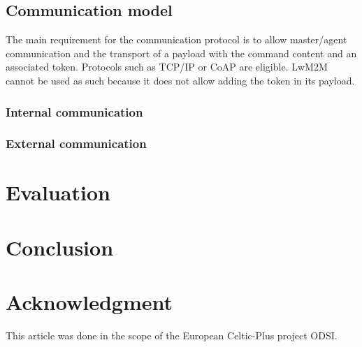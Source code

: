 \documentclass[conference]{IEEEtran}
\begin{document}
\subsection{Communication model}
\label{sec:Communication_model}
The main requirement for the communication protocol is to allow master/agent communication and the transport of a payload with the command content and an associated token. Protocols such as TCP/IP or CoAP are eligible. LwM2M \cite{oma_lwm2M_2017} cannot be used as such because it does not allow adding the token in its payload.

\subsubsection{Internal communication}
\subsubsection{External communication}


\section{Evaluation}

\section{Conclusion}





\section*{Acknowledgment}
This article was done in the scope of the European Celtic-Plus project ODSI.  





\end{document}
